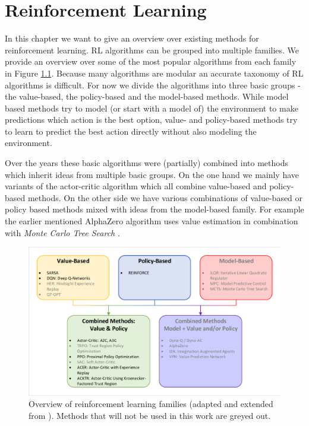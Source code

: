 \chapter{Reinforcement Learning} \label{chp: RLOverview}
In this chapter we want to give an overview over existing methods for reinforcement learning. RL algorithms can be grouped into multiple families. We provide an overview over some of the most popular algorithms from each family in Figure \ref{fig:rl_families}. Because many algorithms are modular an accurate taxonomy of RL algorithms is difficult. For now we divide the algorithms into three basic groups - the value-based, the policy-based and the model-based methods. While model based methods try to model (or start with a model of) the environment to make predictions which action is the best option, value- and policy-based methods try to learn to predict the best action directly without also modeling the environment.

Over the years these basic algorithms were (partially) combined into methods which inherit ideas from multiple basic groups. On the one hand we mainly have variants of the actor-critic algorithm which all combine value-based and policy-based methods. On the other side we have various combinations of value-based or policy based methods mixed with ideas from the model-based family. For example the earlier mentioned AlphaZero algorithm uses value estimation in combination with \textit{Monte Carlo Tree Search} \cite{silver2017mastering}. 

\begin{figure}[ht]
    
  \begin{center}
      \includegraphics[clip, trim=10px 10px 10px 10px, width=0.95\columnwidth]{figures/rl/rl_families.pdf}
  \end{center}
  
  \caption[Overview of RL Families]{Overview of reinforcement learning families (adapted and extended from \cite{foundations2019graesser}). Methods that will not be used in this work are greyed out.}
  \label{fig:rl_families}
\end{figure}

